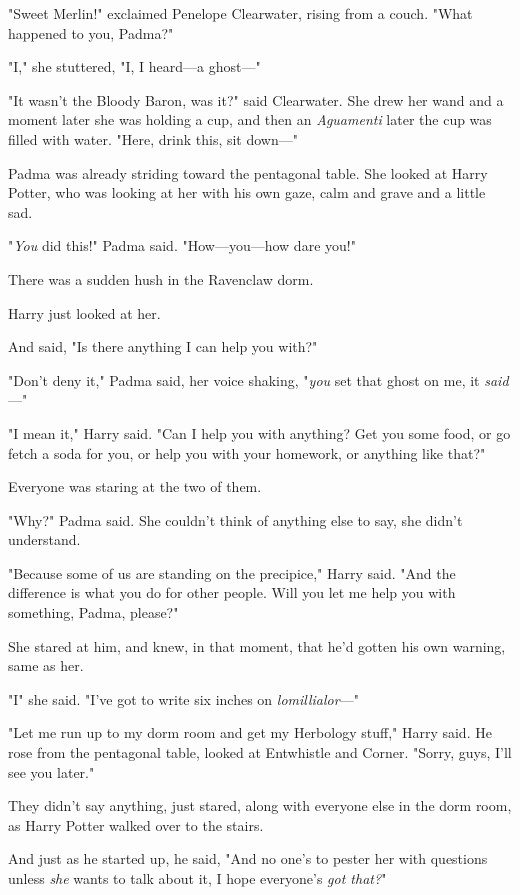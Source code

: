 "Sweet Merlin!" exclaimed Penelope Clearwater, rising from a couch. "What
happened to you, Padma?"

"I," she stuttered, "I, I heard—a ghost—"

"It wasn't the Bloody Baron, was it?" said Clearwater. She drew her wand and a
moment later she was holding a cup, and then an \emph{Aguamenti} later the cup
was filled with water. "Here, drink this, sit down—"

Padma was already striding toward the pentagonal table. She looked at Harry
Potter, who was looking at her with his own gaze, calm and grave and a little
sad.

"\emph{You} did this!" Padma said. "How—you—how dare you!"

There was a sudden hush in the Ravenclaw dorm.

Harry just looked at her.

And said, "Is there anything I can help you with?"

"Don't deny it," Padma said, her voice shaking, "\emph{you} set that ghost on
me, it \emph{said}—"

"I mean it," Harry said. "Can I help you with anything? Get you some food, or
go fetch a soda for you, or help you with your homework, or anything like that?"

Everyone was staring at the two of them.

"Why?" Padma said. She couldn't think of anything else to say, she didn't
understand.

"Because some of us are standing on the precipice," Harry said. "And the
difference is what you do for other people. Will you let me help you with
something, Padma, please?"

She stared at him, and knew, in that moment, that he'd gotten his own warning,
same as her.

"I{\el}" she said. "I've got to write six inches on \emph{lomillialor}—"

"Let me run up to my dorm room and get my Herbology stuff," Harry said. He rose
from the pentagonal table, looked at Entwhistle and Corner. "Sorry, guys, I'll
see you later."

They didn't say anything, just stared, along with everyone else in the dorm
room, as Harry Potter walked over to the stairs.

And just as he started up, he said, "And no one's to pester her with questions
unless \emph{she} wants to talk about it, I hope everyone's \emph{got that?}"

